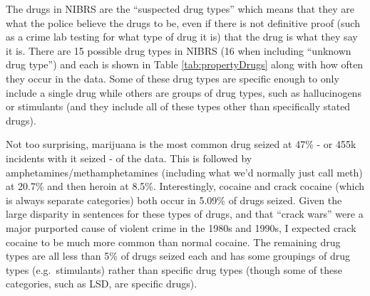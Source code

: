 \documentclass[
  12pt,
  openany]{book}
\begin{document}
The drugs in NIBRS are the ``suspected drug types'' which means that they are what the police believe the drugs to be, even if there is not definitive proof (such as a crime lab testing for what type of drug it is) that the drug is what they say it is. There are 15 possible drug types in NIBRS (16 when including ``unknown drug type'') and each is shown in Table \ref{tab:propertyDrugs} along with how often they occur in the data. Some of these drug types are specific enough to only include a single drug while others are groups of drug types, such as hallucinogens or stimulants (and they include all of these types other than specifically stated drugs).

Not too surprising, marijuana is the most common drug seized at 47\% - or 455k incidents with it seized - of the data. This is followed by amphetamines/methamphetamines (including what we'd normally just call meth) at 20.7\% and then heroin at 8.5\%. Interestingly, cocaine and crack cocaine (which is always separate categories) both occur in 5.09\% of drugs seized. Given the large disparity in sentences for these types of drugs, and that ``crack wars'' were a major purported cause of violent crime in the 1980s and 1990s, I expected crack cocaine to be much more common than normal cocaine. The remaining drug types are all less than 5\% of drugs seized each and has some groupings of drug types (e.g.~stimulants) rather than specific drug types (though some of these categories, such as LSD, are specific drugs).
\end{document}
